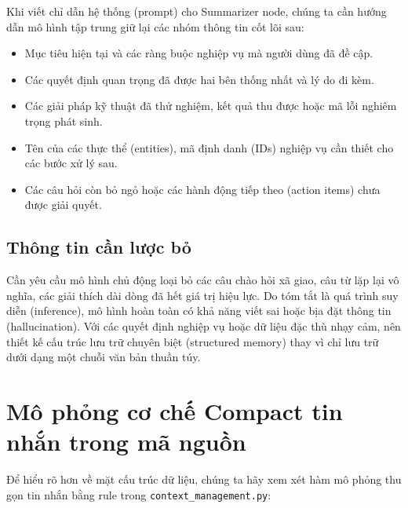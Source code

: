 Khi viết chỉ dẫn hệ thống (prompt) cho Summarizer node, chúng ta cần hướng dẫn mô hình tập trung giữ lại các nhóm thông tin cốt lõi sau:
\begin{itemize}
  \item Mục tiêu hiện tại và các ràng buộc nghiệp vụ mà người dùng đã đề cập.
  \item Các quyết định quan trọng đã được hai bên thống nhất và lý do đi kèm.
  \item Các giải pháp kỹ thuật đã thử nghiệm, kết quả thu được hoặc mã lỗi nghiêm trọng phát sinh.
  \item Tên của các thực thể (entities), mã định danh (IDs) nghiệp vụ cần thiết cho các bước xử lý sau.
  \item Các câu hỏi còn bỏ ngỏ hoặc các hành động tiếp theo (action items) chưa được giải quyết.
\end{itemize}

\subsection{Thông tin cần lược bỏ}
Cần yêu cầu mô hình chủ động loại bỏ các câu chào hỏi xã giao, câu từ lặp lại vô nghĩa, các giải thích dài dòng đã hết giá trị hiệu lực. Do tóm tắt là quá trình suy diễn (inference), mô hình hoàn toàn có khả năng viết sai hoặc bịa đặt thông tin (hallucination). Với các quyết định nghiệp vụ hoặc dữ liệu đặc thù nhạy cảm, nên thiết kế cấu trúc lưu trữ chuyên biệt (structured memory) thay vì chỉ lưu trữ dưới dạng một chuỗi văn bản thuần túy.

\section{Mô phỏng cơ chế Compact tin nhắn trong mã nguồn}

Để hiểu rõ hơn về mặt cấu trúc dữ liệu, chúng ta hãy xem xét hàm mô phỏng thu gọn tin nhắn bằng rule trong \texttt{context\_management.py}:

\begingroup

\endgroup

